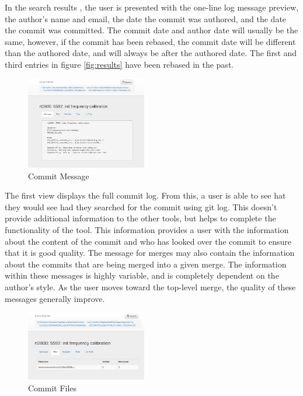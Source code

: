 \documentclass[conference, draftclsnofoot]{IEEEtran}
\begin{document}
In the search results , the user is presented with the one-line log message
preview, the author's name and email, the date the commit was authored, and the
date the commit was committed. 
The commit date and author date will usually be the same, however, if the
commit has been rebased, the commit date will be different than the authored
date, and will always be after the authored date. The first and third entries
in figure \ref{fig:results} have been rebased in the past. 

\begin{figure}[h]
	\centering
	\includegraphics[width=0.47\textwidth]{figures/message_view.png}
	\caption{Commit Message}
	\label{fig:message}
\end{figure}

The first view displays the full commit log. From this, a user is able to see
hat they would see had they searched for the commit using git log. This doesn't
provide additional information to the other tools, but helps to complete the
functionality of the tool. This information provides a user with the
information about the content of the commit and who has looked over the commit
to ensure that it is good quality. The message for merges may also contain the
information about the commits that are being merged into a given merge. The
information within these messages is highly variable, and is completely
dependent on the author's style. As the user moves toward the top-level merge,
the quality of these messages generally improve.

\begin{figure}[h]
	\centering
	\includegraphics[width=0.47\textwidth]{figures/file_view.png}
	\caption{Commit Files}
	\label{fig:files}
\end{figure}
\end{document}
